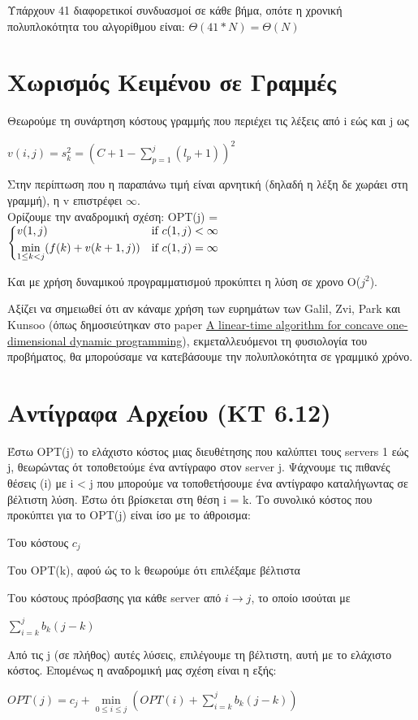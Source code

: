 \documentclass[a4paper,11pt]{article}
\begin{document}
Υπάρχουν 41 διαφορετικοί συνδυασμοί σε κάθε βήμα, οπότε η χρονική
πολυπλοκότητα του αλγορίθμου είναι: $\Theta{(41*N)} = \Theta{(N)}$


\section{Χωρισμός Κειμένου σε Γραμμές}
Θεωρούμε τη συνάρτηση κόστους γραμμής που περιέχει τις λέξεις από i εώς και j
ως \begin{center}$v(i,j) = s_k^2 = (C + 1 - \sum\limits_{p = 1}^{j} (l_p
+1))^2$ \end{center}
Στην περίπτωση που η παραπάνω τιμή είναι αρνητική (δηλαδή η λέξη δε χωράει στη
γραμμή), η v επιστρέφει $\infty$.\\
Ορίζουμε την αναδρομική σχέση:
OPT(j) =$
\begin{dcases}
    v(1,j) & \text{if } c(1,j) < \infty\\
    \min\limits_{1 \leq k < j} (f(k) + v(k + 1, j)) & \text{if } c(1,j) =
    \infty
\end{dcases}$

Και με χρήση δυναμικού προγραμματισμού προκύπτει η λύση σε χρονο O($j^2$).

Αξίζει να σημειωθεί ότι αν κάναμε χρήση των ευρημάτων των Galil, Zvi, Park και
Kunsoo
(όπως δημοσιεύτηκαν στο paper \href{http://www.cs.ust.hk/mjg_lib/bibs/DPSu/DPSu.Files/GaPa90.PDF}{A
linear-time algorithm for concave one-dimensional dynamic programming}),
εκμεταλλευόμενοι τη φυσιολογία του προβήματος, θα
μπορούσαμε να κατεβάσουμε την πολυπλοκότητα σε γραμμικό χρόνο.


\newpage
\section{Αντίγραφα Αρχείου (KT 6.12)}
Έστω OPT(j) το ελάχιστο κόστος μιας διευθέτησης που καλύπτει τους servers 1
εώς j, θεωρώντας ότ τοποθετούμε ένα αντίγραφο στον server j. Ψάχνουμε τις
πιθανές θέσεις (i) με i < j που μπορούμε να τοποθετήσουμε ένα αντίγραφο
καταλήγωντας σε βέλτιστη λύση. Έστω ότι βρίσκεται στη θέση i = k.
Το συνολικό κόστος που προκύπτει για το OPT(j) είναι ίσο με το άθροισμα:
\begin{list}{*}{}
\item Του κόστους $c_j$
\item Του OPT(k), αφού ώς το k θεωρούμε ότι επιλέξαμε βέλτιστα
\item Του κόστους πρόσβασης για κάθε server από $i \to j$, το οποίο ισούται με
\begin{center} $\sum\limits_{i = k}^{j} b_k (j-k)$ \end{center}
\end{list}
Από τις j (σε πλήθος) αυτές λύσεις, επιλέγουμε τη βέλτιστη, αυτή με το
ελάχιστο κόστος. Επομένως η αναδρομική μας σχέση είναι η εξής:
\begin{center}
$OPT(j) = c_j + \min\limits_{0 \leq i \leq j}(OPT(i)+\sum\limits_{i = k}^{j}
b_k (j-k))$
\end{center}
\end{document}
